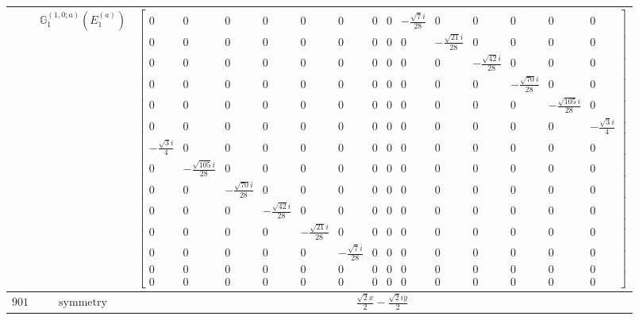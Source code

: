 \documentclass[fleqn,8pt,landscape]{jsarticle}
\begin{document}
\begin{longtable}{ccc}
$  $ & $ \mathbb{G}_{1}^{(1,0;a)}(E_{1}^{(a)}) $ & $ \begin{bmatrix} 0 & 0 & 0 & 0 & 0 & 0 & 0 & 0 & - \frac{\sqrt{7} i}{28} & 0 & 0 & 0 & 0 & 0 \\ 0 & 0 & 0 & 0 & 0 & 0 & 0 & 0 & 0 & - \frac{\sqrt{21} i}{28} & 0 & 0 & 0 & 0 \\ 0 & 0 & 0 & 0 & 0 & 0 & 0 & 0 & 0 & 0 & - \frac{\sqrt{42} i}{28} & 0 & 0 & 0 \\ 0 & 0 & 0 & 0 & 0 & 0 & 0 & 0 & 0 & 0 & 0 & - \frac{\sqrt{70} i}{28} & 0 & 0 \\ 0 & 0 & 0 & 0 & 0 & 0 & 0 & 0 & 0 & 0 & 0 & 0 & - \frac{\sqrt{105} i}{28} & 0 \\ 0 & 0 & 0 & 0 & 0 & 0 & 0 & 0 & 0 & 0 & 0 & 0 & 0 & - \frac{\sqrt{3} i}{4} \\ - \frac{\sqrt{3} i}{4} & 0 & 0 & 0 & 0 & 0 & 0 & 0 & 0 & 0 & 0 & 0 & 0 & 0 \\ 0 & - \frac{\sqrt{105} i}{28} & 0 & 0 & 0 & 0 & 0 & 0 & 0 & 0 & 0 & 0 & 0 & 0 \\ 0 & 0 & - \frac{\sqrt{70} i}{28} & 0 & 0 & 0 & 0 & 0 & 0 & 0 & 0 & 0 & 0 & 0 \\ 0 & 0 & 0 & - \frac{\sqrt{42} i}{28} & 0 & 0 & 0 & 0 & 0 & 0 & 0 & 0 & 0 & 0 \\ 0 & 0 & 0 & 0 & - \frac{\sqrt{21} i}{28} & 0 & 0 & 0 & 0 & 0 & 0 & 0 & 0 & 0 \\ 0 & 0 & 0 & 0 & 0 & - \frac{\sqrt{7} i}{28} & 0 & 0 & 0 & 0 & 0 & 0 & 0 & 0 \\ 0 & 0 & 0 & 0 & 0 & 0 & 0 & 0 & 0 & 0 & 0 & 0 & 0 & 0 \\ 0 & 0 & 0 & 0 & 0 & 0 & 0 & 0 & 0 & 0 & 0 & 0 & 0 & 0 \end{bmatrix} $ \\ \hline
$ 901 $ & $ \text{symmetry} $ & $ \frac{\sqrt{2} x}{2} - \frac{\sqrt{2} i y}{2} $ \\

\end{longtable}
\end{document}
